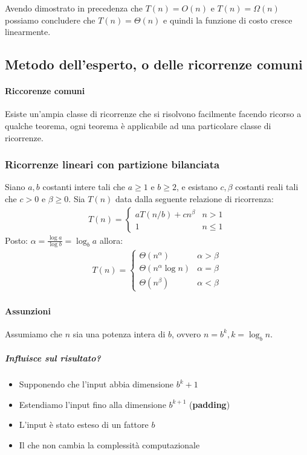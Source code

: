                 Avendo dimostrato in precedenza che $ T(n) = O(n) $ e $ T(n) = \Omega(n) $ possiamo concludere che $ T(n) = \Theta(n) $ e quindi la funzione di costo cresce linearmente.
    \subsection{Metodo dell'esperto, o delle ricorrenze comuni}
        \paragraph{Riccorenze comuni} Esiste un'ampia classe di ricorrenze che si risolvono facilmente facendo ricorso a qualche teorema, ogni teorema è applicabile ad una particolare classe di ricorrenze.
        \subsubsection{Ricorrenze lineari con partizione bilanciata}
            \begin{theorem}
                Siano $ a,b $ costanti intere tali che $ a \geq 1 $ e $ b \geq 2 $, e esistano $c,\beta$ costanti reali tali che $ c > 0 $ e $ \beta \geq 0 $. Sia $ T(n) $ data dalla seguente relazione di ricorrenza:
                \begin{align}
                    T(n)=\begin{cases}
                        aT(n/b) + cn^\beta & n>1 \\
                        1 & n\leq 1
                    \end{cases}
                \end{align}
                Posto: $\alpha = \frac{\log a}{\log b}= \log_b a$ allora:
                \begin{align}
                    T(n)=\begin{cases}
                        \Theta(n^\alpha) & \alpha > \beta \\
                        \Theta(n^\alpha\log n) & \alpha = \beta \\
                        \Theta(n^\beta) & \alpha < \beta
                    \end{cases}
                \end{align}
            \end{theorem}
            \paragraph{Assunzioni} Assumiamo che $ n $ sia una potenza intera di $ b $, ovvero $ n=b^k, k=\log_bn $.
                \subparagraph{Influisce sul risultato?}
                    \begin{itemize}
                        \item Supponendo che l'input abbia dimensione $b^{k}+1$
                        \item Estendiamo l'input fino alla dimensione $b^{k+1}$ (\textbf{padding})
                        \item L'input è stato esteso di un fattore $b$
                        \item Il che non cambia la complessità computazionale
                    \end{itemize}
